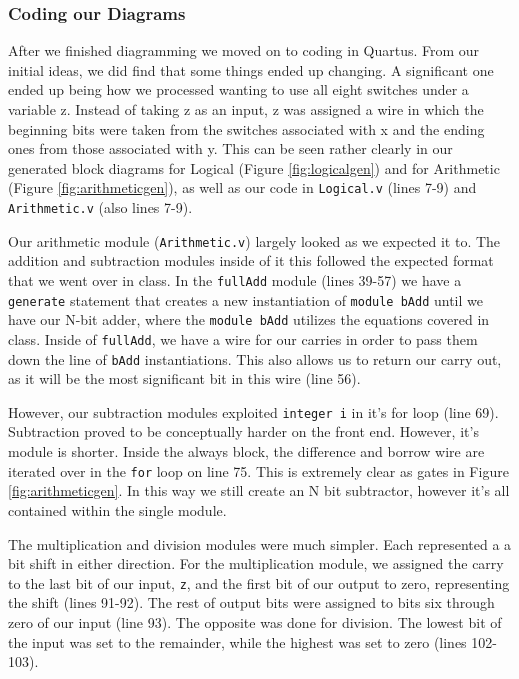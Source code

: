 \documentclass[11pt]{article}
\begin{document}
\subsubsection{Coding our Diagrams}
After we finished diagramming we moved on to coding in Quartus. From our initial ideas, we did find that some things ended up changing. A significant one ended up being how we processed wanting to use all eight switches under a variable z. Instead of taking z as an input, z was assigned a wire in which the beginning bits were taken from the switches associated with x and the ending ones from those associated with y. This can be seen rather clearly in our generated block diagrams for Logical (Figure \ref{fig:logicalgen}) and for Arithmetic (Figure \ref{fig:arithmeticgen}), as well as our code in \texttt{Logical.v} (lines 7-9) and \texttt{Arithmetic.v} (also lines 7-9).

Our arithmetic module (\texttt{Arithmetic.v}) largely looked as we expected it to. The addition and subtraction modules inside of it this followed the expected format that we went over in class. In the \texttt{fullAdd} module (lines 39-57) we have a \texttt{generate} statement that creates a new instantiation of \texttt{module bAdd} until we have our N-bit adder, where the \texttt{module bAdd} utilizes the equations covered in class. Inside of \texttt{fullAdd}, we have a wire for our carries in order to pass them down the line of \texttt{bAdd} instantiations. This also allows us to return our carry out, as it will be the most significant bit in this wire (line 56).

However, our subtraction modules exploited \texttt{integer i} in it's for loop (line 69). Subtraction proved to be conceptually harder on the front end. However, it's module is shorter. Inside the always block, the difference and borrow wire are iterated over in the \texttt{for} loop on line 75. This is extremely clear as gates in Figure \ref{fig:arithmeticgen}. In this way we still create an N bit subtractor, however it's all contained within the single module.

The multiplication and division modules were much simpler. Each represented a a bit shift in either direction. For the multiplication module, we assigned the carry to the last bit of our input, \texttt{z}, and the first bit of our output to zero, representing the shift (lines 91-92). The rest of output bits were assigned to bits six through zero of our input (line 93). The opposite was done for division. The lowest bit of the input was set to the remainder, while the highest was set to zero (lines 102-103).
\end{document}
